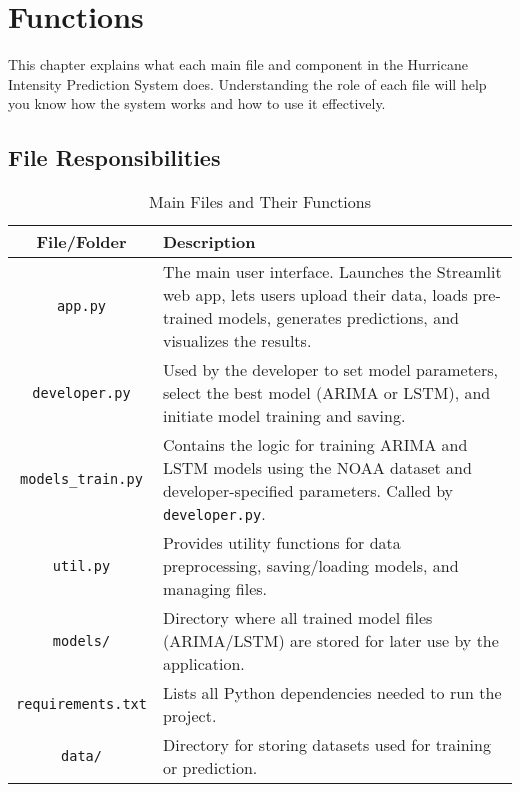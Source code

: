 %
%

\chapter{Functions}

This chapter explains what each main file and component in the Hurricane Intensity Prediction System does. Understanding the role of each file will help you know how the system works and how to use it effectively.

\section*{File Responsibilities}

\begin{table}[h]
	\centering
	\begin{tabular}{|c|p{10cm}|}
		\hline
		\textbf{File/Folder} & \textbf{Description} \\
		\hline
		\texttt{app.py} & The main user interface. Launches the Streamlit web app, lets users upload their data, loads pre-trained models, generates predictions, and visualizes the results. \\
		\hline
		\texttt{developer.py} & Used by the developer to set model parameters, select the best model (ARIMA or LSTM), and initiate model training and saving. \\
		\hline
		\texttt{models\_train.py} & Contains the logic for training ARIMA and LSTM models using the NOAA dataset and developer-specified parameters. Called by \texttt{developer.py}. \\
		\hline
		\texttt{util.py} & Provides utility functions for data preprocessing, saving/loading models, and managing files. \\
		\hline
		\texttt{models/} & Directory where all trained model files (ARIMA/LSTM) are stored for later use by the application. \\
		\hline
		\texttt{requirements.txt} & Lists all Python dependencies needed to run the project. \\
		\hline
		\texttt{data/} & Directory for storing datasets used for training or prediction. \\
		\hline
	\end{tabular}
	\caption{Main Files and Their Functions}
	\label{tab:file_functions}
\end{table}

